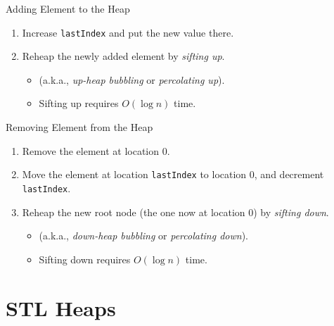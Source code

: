 \documentclass[14pt, aspectratio=1610]{beamer}
\begin{document}
\begin{frame}{Adding Element to the Heap}
  \begin{enumerate}
    \item<+->
      Increase \lstinline{lastIndex} and put the new value there.
    \item<+->
      Reheap the newly added element by \emph{sifting up}.
      \begin{itemize}
        \item
          (a.k.a., \emph{up-heap bubbling} or \emph{percolating up}).
        \item
          Sifting up requires \(O(\log n)\) time.
      \end{itemize}
  \end{enumerate}
\end{frame}

\begin{frame}{Removing Element from the Heap}
  \begin{enumerate}
    \item<+->
      Remove the element at location 0.
    \item<+->
      Move the element at location \lstinline{lastIndex} to location 0, and decrement \lstinline{lastIndex}.
    \item<+->
      Reheap the new root node (the one now at location 0) by \emph{sifting down}.
      \begin{itemize}
        \item
          (a.k.a., \emph{down-heap bubbling} or \emph{percolating down}).
        \item
          Sifting down requires \(O(\log n)\) time.
    \end{itemize}
  \end{enumerate}
\end{frame}

\section{STL Heaps}
\end{document}

